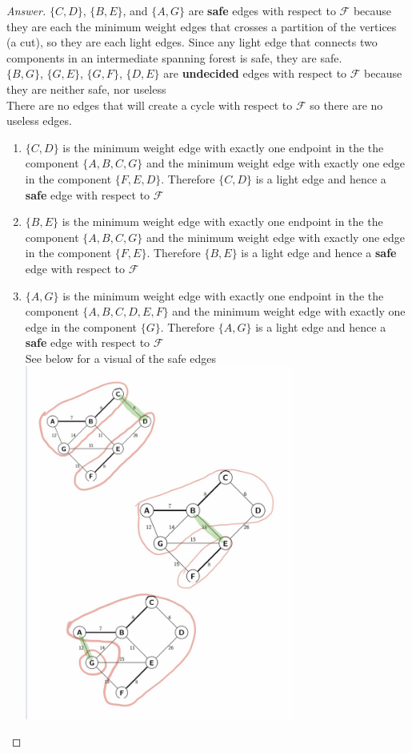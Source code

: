 \documentclass[11pt]{article}
\theoremstyle{definition}
\theoremstyle{definition}
\theoremstyle{definition}
\begin{document}
\begin{proof}[Answer]
$\{C,D\}$, $\{B,E\}$, and $\{A,G\}$ are \textbf{safe} edges with respect to  $\mathcal{F}$ because they are each the minimum weight edges that crosses a partition of the vertices (a cut), so they are each light edges. Since any light edge that connects two components in an intermediate spanning forest is safe, they are safe.  \\
$\{B,G\}$, $\{G,E\}$, $\{G,F\}$, $\{D,E\}$ are  \textbf{undecided} edges with respect to  $\mathcal{F}$ because they are neither safe, nor useless \\
There are no edges that will create a cycle with respect to $\mathcal{F}$ so there are no useless edges. \\
\begin{enumerate}
\item $\{C,D\}$ is the minimum weight edge with exactly one endpoint in the the component $\{A,B,C,G\}$ and the minimum weight edge with exactly one edge in the component $\{F,E,D\}$. Therefore $\{C,D\}$ is a light edge and hence a \textbf{safe} edge with respect to  $\mathcal{F}$
\item $\{B,E\}$ is the minimum weight edge with exactly one endpoint in the the component $\{A,B,C,G\}$ and the minimum weight edge with exactly one edge in the component $\{F,E\}$. Therefore $\{B,E\}$ is a light edge and hence a \textbf{safe} edge with respect to  $\mathcal{F}$
\item $\{A,G\}$ is the minimum weight edge with exactly one endpoint in the the component $\{A,B,C,D,E,F\}$ and the minimum weight edge with exactly one edge in the component $\{G\}$. Therefore $\{A,G\}$ is a light edge and hence a \textbf{safe} edge with respect to  $\mathcal{F}$ \\

See below for a visual of the safe edges \\

\includegraphics[width=0.7\textwidth]{hw3problem1} \\


\end{enumerate}
\end{proof}
\end{document}
